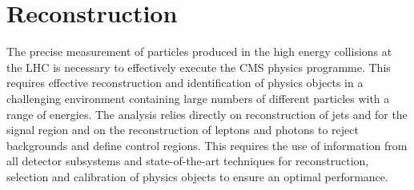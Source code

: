 \chapter{Reconstruction} %

The precise measurement of particles produced in the high energy collisions at the LHC 
is necessary to effectively execute the CMS physics programme. This requires effective
reconstruction and identification of physics objects in a challenging environment containing
large numbers of different particles with a range of energies. The \alphat analysis 
relies directly on reconstruction of jets and \met for the signal region and on the 
reconstruction of leptons and photons to reject backgrounds and define control regions.
This requires the use of information from all detector subsystems and state-of-the-art
techniques for reconstruction, selection and calibration of physics objects to ensure 
an optimal performance. 


